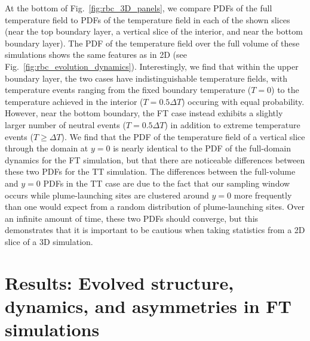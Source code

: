 \documentclass[aps, pre, onecolumn, nofootinbib, notitlepage, groupedaddress, amsfonts, amssymb, amsmath, longbibliography, superscriptaddress]{revtex4-1}
\newcommand{\ea}[1]{{\color{red} #1}}
\begin{document}
At the bottom of Fig.~\ref{fig:rbc_3D_panels}, we compare PDFs of the full temperature field to PDFs of the temperature field in each of the shown slices (near the top boundary layer, a vertical slice of the interior, and near the bottom boundary layer).
The PDF of the temperature field over the full volume of these simulations shows the same features as in 2D (see Fig.~\ref{fig:rbc_evolution_dynamics}).
Interestingly, we find that within the upper boundary layer, the two cases have indistinguishable temperature fields, with temperature events ranging from the fixed boundary temperature ($T = 0$) to the temperature achieved in the interior ($T = 0.5\Delta T$) occuring with equal probability.
However, near the bottom boundary, the FT case instead exhibits a slightly larger number of neutral events ($T = 0.5\Delta T$) in addition to extreme temperature events ($T \geq \Delta T$).
\ea{
We find that the PDF of the temperature field of a vertical slice through the domain at $y = 0$ is nearly identical to the PDF of the full-domain dynamics for the FT simulation, but that there are noticeable differences between these two PDFs for the TT simulation.
The differences between the full-volume and $y = 0$ PDFs in the TT case are due to the fact that our sampling window occurs while plume-launching sites are clustered around $y = 0$ more frequently than one would expect from a random distribution of plume-launching sites.
Over an infinite amount of time, these two PDFs should converge, but this demonstrates that it is important to be cautious when taking statistics from a 2D slice of a 3D simulation.
}

\FloatBarrier



\section{Results: Evolved structure, dynamics, and asymmetries in FT simulations}
\label{sec:results_dynamics}
\end{document}
